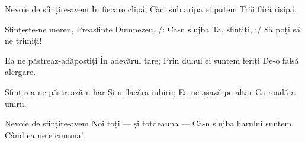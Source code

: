 \beginverse
Nevoie de sfințire-avem
În fiecare clipă,
Căci sub aripa ei putem
Trăi fără risipă.
\endverse

\beginchorus
Sfințește-ne mereu,
Preasfinte Dumnezeu,
/: Ca-n slujba Ta, sfințiți, :/
Să poți să ne trimiți!
\endchorus

\beginverse
Ea ne păstreaz-adăpostiți
În adevărul tare;
Prin duhul ei suntem feriți
De-o falsă alergare.
\endverse

\beginverse
Sfințirea ne păstrează-n har
Și-n flacăra iubirii;
Ea ne așază pe altar
Ca roadă a unirii.
\endverse

\beginverse
Nevoie de sfințire-avem
Noi toți — și totdeauna —
Că-n slujba harului suntem
Când ea ne e cununa!
\endverse
\endsong